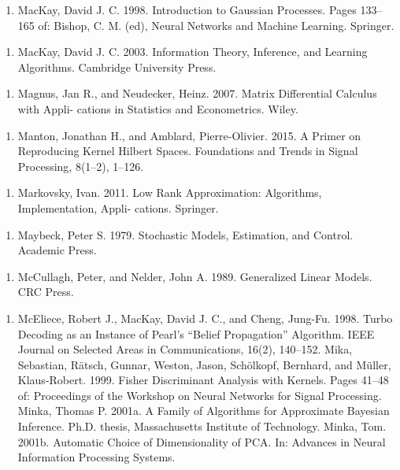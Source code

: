 \begin{enumerate}
\item MacKay, David J. C. 1998. Introduction to Gaussian Processes. Pages 133–165 of: Bishop, C. M. (ed), Neural Networks and Machine Learning. Springer.
\end{enumerate}

\begin{enumerate}
\item MacKay, David J. C. 2003. Information Theory, Inference, and Learning Algorithms. Cambridge University Press.
\end{enumerate}

\begin{enumerate}
\item Magnus, Jan R., and Neudecker, Heinz. 2007. Matrix Differential Calculus with Appli- cations in Statistics and Econometrics. Wiley.
\end{enumerate}

\begin{enumerate}
\item Manton, Jonathan H., and Amblard, Pierre-Olivier. 2015. A Primer on Reproducing Kernel Hilbert Spaces. Foundations and Trends in Signal Processing, 8(1–2), 1–126.
\end{enumerate}

\begin{enumerate}
\item Markovsky, Ivan. 2011. Low Rank Approximation: Algorithms, Implementation, Appli- cations. Springer.
\end{enumerate}

\begin{enumerate}
\item Maybeck, Peter S. 1979. Stochastic Models, Estimation, and Control. Academic Press.
\end{enumerate}

\begin{enumerate}
\item McCullagh, Peter, and Nelder, John A. 1989. Generalized Linear Models. CRC Press.
\end{enumerate}

\begin{enumerate}
\item McEliece, Robert J., MacKay, David J. C., and Cheng, Jung-Fu. 1998. Turbo Decoding as an Instance of Pearl’s “Belief Propagation” Algorithm. IEEE Journal on Selected Areas in Communications, 16(2), 140–152. Mika, Sebastian, Rätsch, Gunnar, Weston, Jason, Schölkopf, Bernhard, and Müller, Klaus-Robert. 1999. Fisher Discriminant Analysis with Kernels. Pages 41–48 of: Proceedings of the Workshop on Neural Networks for Signal Processing. Minka, Thomas P. 2001a. A Family of Algorithms for Approximate Bayesian Inference. Ph.D. thesis, Massachusetts Institute of Technology. Minka, Tom. 2001b. Automatic Choice of Dimensionality of PCA. In: Advances in Neural Information Processing Systems.
\end{enumerate}

